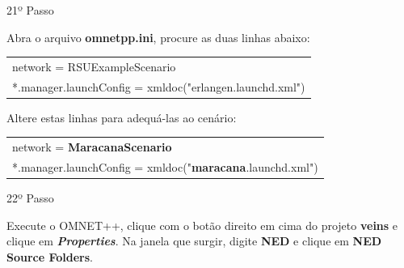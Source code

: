 \documentclass[
12pt,				%
openright,			%
oneside,			%
a4paper,			%
brazil,				%
]{abntex2}
\begin{document}
{\begin{anexosenv}
        	
            	\begin{description}
                    \item[21º Passo]
                \end{description}
                \par Abra o arquivo \textbf{omnetpp.ini}, procure as duas linhas abaixo:
                
	            \begin{table}[H]
		            \renewcommand{\arraystretch}{1.5}
	                \begin{tabular}{|p{15.5cm}|}
		                \hline
                        network = RSUExampleScenario \\
                        *.manager.launchConfig = xmldoc("erlangen.launchd.xml") \\
		                \hline
		            \end{tabular}
	            \end{table}
	            
	            \par Altere estas linhas para adequá-las ao cenário:
                
	            \begin{table}[H]
		            \renewcommand{\arraystretch}{1.5}
	                \begin{tabular}{|p{15.5cm}|}
		                \hline
                        network = \textbf{MaracanaScenario} \\
                        *.manager.launchConfig = xmldoc("\textbf{maracana}.launchd.xml") \\
		                \hline
		            \end{tabular}
	            \end{table}
                
        	
            	\begin{description}
                    \item[22º Passo]
                \end{description}
                \par Execute o OMNET++, clique com o botão direito em cima do projeto \textbf{veins} e clique em \textbf{\textit{Properties}}. Na janela que surgir, digite \textbf{NED} e clique em \textbf{NED Source Folders}.
		            

\end{anexosenv}}
\end{document}
